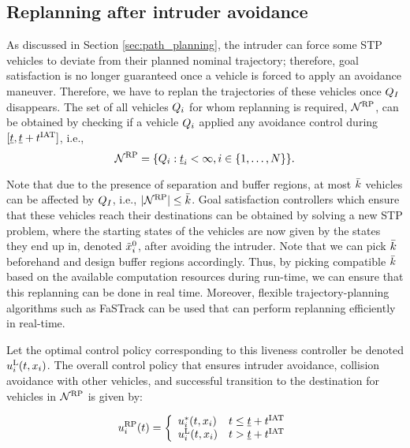 \subsection{Replanning after intruder avoidance} \label{sec:replan}
As discussed in Section \ref{sec:path_planning}, the intruder can force some STP vehicles to deviate from their planned nominal trajectory; therefore, goal satisfaction is no longer guaranteed once a vehicle is forced to apply an avoidance maneuver. Therefore, we have to replan the trajectories of these vehicles once $Q_{I}$ disappears. The set of all vehicles $Q_i$ for whom replanning is required, $\mathcal{N}^\text{RP}$, can be obtained by checking if a vehicle $Q_i$ applied any avoidance control during $[\underline{t}, \underline{t}+t^\text{IAT}]$, i.e.,
\begin{equation} \label{eq:RVS}
\rvs = \{\veh_i: \tsa_i < \infty, i \in \{1, \ldots, \N \} \}. 
\end{equation}  

Note that due to the presence of separation and buffer regions, at most $\bar{k}$ vehicles can be affected by $Q_{I}$, i.e., $|\mathcal{N}^\text{RP}| \leq \bar{k}$. Goal satisfaction controllers which ensure that these vehicles reach their destinations can be obtained by solving a new STP problem, where the starting states of the vehicles are now given by the states they end up in, denoted $\tilde{x}_i^0$, after avoiding the intruder. Note that we can pick $\bar{k}$ beforehand and design buffer regions accordingly. Thus, by picking compatible $\bar{k}$ based on the available computation resources during run-time, we can ensure that this replanning can be done in real time. Moreover, flexible trajectory-planning algorithms such as FaSTrack \cite{Herbert2017} can be used that can perform replanning efficiently in real-time.   

Let the optimal control policy corresponding to this liveness controller be denoted ${u^{\text{L}}_{i}}(t, x_i)$. The overall control policy that ensures intruder avoidance, collision avoidance with other vehicles, and successful transition to the destination for vehicles in $\mathcal{N}^\text{RP}$ is given by:

\begin{equation} \label{eqn:full_controller}
\ctrl_i^{\text{RP}}(t) = 
\left \{ 
\begin{array}{ll}
{\ctrl^*_{i}}(t, \state_i) & t \leq \tsa + \iat\\
{\ctrl^{\text{L}}_{i}}(t, \state_i) & t > \tsa + \iat
\end{array}
\right.
\end{equation}

